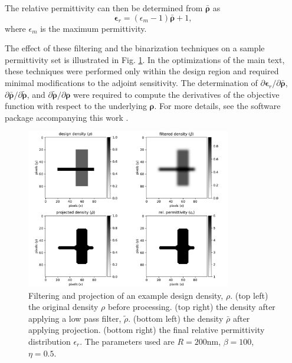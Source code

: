 The relative permittivity can then be determined from $\bm{\bar{\rho}}$ as
\begin{equation}
\bm{\epsilon}_r = (\epsilon_m - 1)\bm{\bar{\rho}} + 1,
\end{equation}
where $\epsilon_m$ is the maximum permittivity. 

The effect of these filtering and the binarization techniques on a sample permittivity set is illustrated in Fig. \ref{fig:filter}. In the optimizations of the main text, these techniques were performed only within the design region and required minimal modifications to the adjoint sensitivity.  The determination of $\partial \bm{\epsilon}_r / \partial \bm{\bar{\rho}}$, $\partial \bm{\bar{\rho}} / \partial \bm{\tilde{\rho}}$, and $\partial \bm{\tilde{\rho}} / \partial \bm{\rho}$ were required to compute the derivatives of the objective function with respect to the underlying $\bm{\rho}$.  For more details, see the software package accompanying this work \cite{hughes2018fdfdpy}.

\begin{figure}[t]
\centering
\includegraphics[width=0.8\textwidth]{figures/angler_filter.pdf}
\caption{\label{fig:filter} Filtering and projection of an example design density, $\rho$. (top left) the original density $\rho$ before processing.  (top right) the density after applying a low pass filter, $\tilde{\rho}$.  (bottom left) the density $\bar{\rho}$ after applying projection.  (bottom right) the final relative permittivity distribution $\epsilon_r$. The parameters used are $R = 200$nm, $\beta = 100$, $\eta = 0.5$.}
\end{figure}


